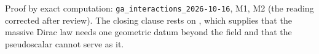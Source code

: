 Proof by exact computation: \texttt{ga\_interactions\_2026-10-16}, M1, M2 (the reading corrected after review). The closing clause rests on , which supplies that the massive Dirac law needs one geometric datum beyond the field and that the pseudoscalar cannot serve as it.
